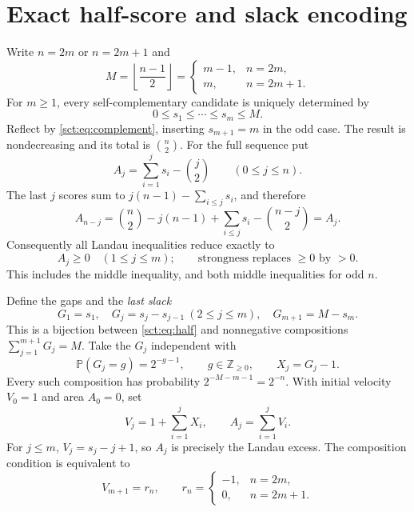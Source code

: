 \documentclass[11pt,letterpaper]{article}
\theoremstyle{definition}\newtheorem{remark}[theorem]{Remark}
\newcommand{\Pp}{\mathbb P}\newcommand{\Ee}{\mathbb E}
\newcommand{\Z}{\mathbb Z}\newcommand{\R}{\mathbb R}\newcommand{\NN}{\mathbb N}
\begin{document}
\section{Exact half-score and slack encoding}\label{sct:sec:encoding}
Write $n=2m$ or $n=2m+1$ and
\[
 M=\left\lfloor\frac{n-1}{2}\right\rfloor
 =\begin{cases}m-1,&n=2m,\\m,&n=2m+1.\end{cases}
\]
For $m\ge1$, every self-complementary candidate is uniquely determined by
\begin{equation}\label{sct:eq:half}
 0\le s_1\le\cdots\le s_m\le M.
\end{equation}
Reflect by \eqref{sct:eq:complement}, inserting $s_{m+1}=m$ in the odd case.
The result is nondecreasing and its total is $\binom n2$.
For the full sequence put
\[
 A_j=\sum_{i=1}^j s_i-\binom j2\qquad(0\le j\le n).
\]
The last $j$ scores sum to $j(n-1)-\sum_{i\le j}s_i$, and therefore
\[
 A_{n-j}=\binom n2-j(n-1)+\sum_{i\le j}s_i-\binom{n-j}2=A_j.
\]
Consequently all Landau inequalities reduce exactly to
\begin{equation}\label{sct:eq:Landau}
 A_j\ge0\quad(1\le j\le m);
 \qquad\text{strongness replaces $\ge0$ by $>0$.}
\end{equation}
This includes the middle inequality, and both middle inequalities for odd $n$.

Define the gaps and the \emph{last slack}
\begin{equation}\label{sct:eq:gaps}
 G_1=s_1,\quad G_j=s_j-s_{j-1}\ (2\le j\le m),\quad
 G_{m+1}=M-s_m.
\end{equation}
This is a bijection between \eqref{sct:eq:half} and nonnegative compositions
$\sum_{j=1}^{m+1}G_j=M$. Take the $G_j$ independent with
\begin{equation}\label{sct:eq:geom}
 \Pp(G_j=g)=2^{-g-1},\qquad g\in\Z_{\ge0},
 \qquad X_j=G_j-1.
\end{equation}
Every such composition has probability $2^{-M-m-1}=2^{-n}$.
With initial velocity $V_0=1$ and area $A_0=0$, set
\[
 V_j=1+\sum_{i=1}^jX_i,\qquad A_j=\sum_{i=1}^jV_i.
\]
For $j\le m$, $V_j=s_j-j+1$, so $A_j$ is precisely the Landau excess.
The composition condition is equivalent to
\begin{equation}\label{sct:eq:rn}
 V_{m+1}=r_n,\qquad
 r_n=\begin{cases}-1,&n=2m,\\0,&n=2m+1.\end{cases}
\end{equation}
\end{document}
